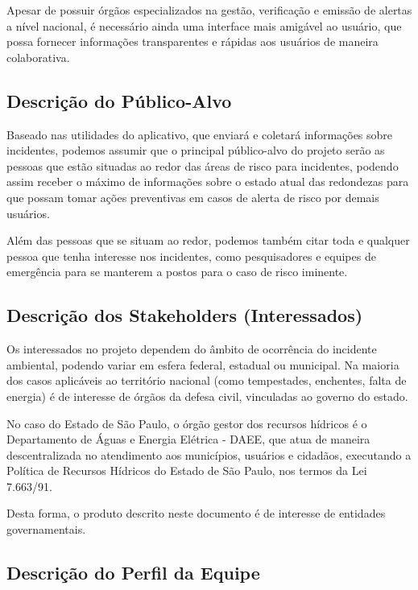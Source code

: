 \documentclass[12pt]{article}
\begin{document}
Apesar de possuir órgãos especializados na gestão, verificação e emissão de alertas a nível nacional, é necessário ainda uma interface mais amigável ao usuário, que possa fornecer informações transparentes e rápidas aos usuários de maneira colaborativa.


\subsection{Descrição do Público-Alvo}

Baseado nas utilidades do aplicativo, que enviará e coletará informações sobre incidentes, podemos assumir que o principal público-alvo do projeto serão as pessoas que estão situadas ao redor das áreas de risco para incidentes, podendo assim receber o máximo de informações sobre o estado atual das redondezas para que possam tomar ações preventivas em casos de alerta de risco por demais usuários.

Além das pessoas que se situam ao redor, podemos também citar toda e qualquer pessoa que tenha interesse nos incidentes, como pesquisadores e equipes de emergência para se manterem a postos para o caso de risco iminente.

\subsection{Descrição dos Stakeholders (Interessados)}

Os interessados no projeto dependem do âmbito de ocorrência do incidente ambiental, podendo variar em esfera federal, estadual ou municipal. Na maioria dos casos aplicáveis ao território nacional (como tempestades, enchentes, falta de energia) é de interesse de órgãos da defesa civil, vinculadas ao governo do estado. 

No caso do Estado de São Paulo, o órgão gestor dos recursos hídricos é o Departamento de Águas e Energia Elétrica - DAEE, que atua de maneira descentralizada no atendimento aos municípios, usuários e cidadãos, executando a Política de Recursos Hídricos do Estado de São Paulo, nos termos da Lei 7.663/91.

Desta forma, o produto descrito neste documento é de interesse de entidades governamentais.

\subsection{Descrição do Perfil da Equipe}
\end{document}
